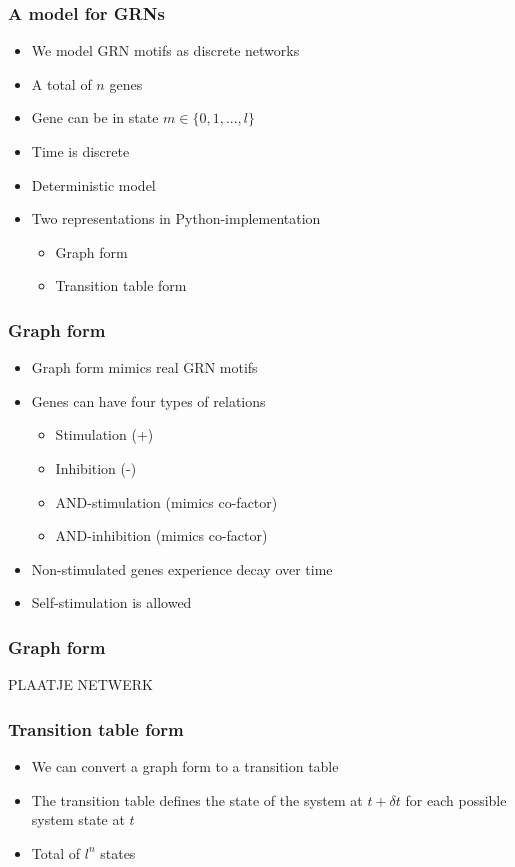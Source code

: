 \documentclass[hyperref={pdfpagelabels=false}]{beamer}
\begin{document}
\begin{frame}
\frametitle{A model for GRNs}
\begin{itemize}
\item We model GRN motifs as discrete networks
\item A total of $n$ genes
\item Gene can be in state $m \in \{0, 1, ..., l\}$
\item Time is discrete
\item Deterministic model
\item Two representations in Python-implementation
\begin{itemize}
\item Graph form
\item Transition table form
\end{itemize}
\end{itemize}
\end{frame}

\begin{frame}
\frametitle{Graph form}
\begin{itemize}
\item Graph form mimics real GRN motifs
\item Genes can have four types of relations
\begin{itemize}
\item Stimulation (+)
\item Inhibition (-)
\item AND-stimulation (mimics co-factor)
\item AND-inhibition (mimics co-factor)
\end{itemize}
\item Non-stimulated genes experience decay over time
\item Self-stimulation is allowed \cite{thomas1995dynamical, zhou2016relative}
\end{itemize}
\end{frame}

\begin{frame}
\frametitle{Graph form}
PLAATJE NETWERK
\end{frame}

\begin{frame}
\frametitle{Transition table form}
\begin{itemize}
\item We can convert a graph form to a transition table
\item The transition table defines the state of the system at $t + \delta t$ for each possible system state at $t$
\item Total of $l^n$ states
\end{itemize}
\end{frame}
\end{document}
